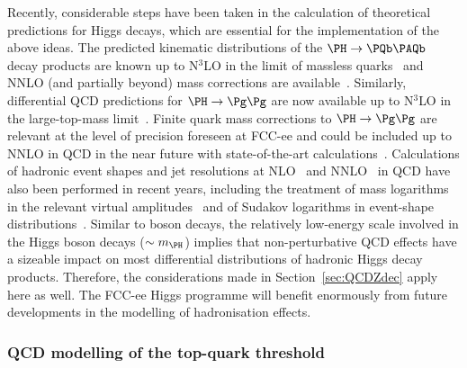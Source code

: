 Recently, considerable steps have been taken in the calculation of theoretical predictions for Higgs decays, 
which are essential for the implementation of the above ideas. 
The predicted kinematic distributions of the $\PH \to \PQb\PAQb$ decay products are 
known up to N$^3$LO in the limit of 
massless \PQb quarks~\cite{Anastasiou:2011qx,DelDuca:2015zqa,Caola:2017xuq,Ferrera:2017zex,Mondini:2019gid,Gauld:2019yng}
and NNLO (and partially beyond) mass corrections are
available~\cite{Chetyrkin:1995pd,Larin:1995sq,Harlander:1997xa,Bernreuther:2018ynm,Primo:2018zby,Behring:2019oci,Mondini:2020uyy,Behring:2020uzq}. 
Similarly, differential QCD predictions for $\PH \to \Pg\Pg$ are now available up to N$^3$LO in the large-top-mass limit~\cite{Chen:2023fba}.
Finite quark mass corrections to $\PH \to \Pg\Pg$ are relevant at the level of precision foreseen at FCC-ee
and could be included up to NNLO in QCD in the near future with state-of-the-art 
calculations~\cite{Djouadi:1995gt,Spira:1995rr,Larin:1995sq,Schreck:2007um,Melnikov:2016qoc,Melnikov:2017pgf,Kudashkin:2017skd,Frellesvig:2019byn}.
Calculations of hadronic event shapes and jet resolutions at NLO~\cite{Gao:2019mlt,Luo:2019nig,Gao:2020vyx} and
NNLO~\cite{Mondini:2019vub} in QCD have also been performed in recent years, 
including the treatment of mass logarithms in the relevant virtual
amplitudes~\cite{Banfi:2013eda,Grazzini:2013mca,Melnikov:2016emg,Liu:2017vkm,Liu:2018czl,Liu:2020tzd,Anastasiou:2020vkr,Liu:2021chn,Liu:2022ajh}
and of Sudakov logarithms in event-shape distributions~\cite{Ju:2023dfa}.
Similar to \PZ boson decays, 
the relatively low-energy scale involved in the Higgs boson decays ($\sim m_{\PH}$) 
implies that non-perturbative QCD effects have a sizeable impact on most differential distributions of hadronic Higgs decay products.
Therefore, the considerations made in Section~\ref{sec:QCDZdec} apply here as well. 
The FCC-ee Higgs programme will benefit enormously from future developments in the modelling of hadronisation effects.

\subsubsection{QCD modelling of the top-quark threshold}
\label{sec:QCDtop}

